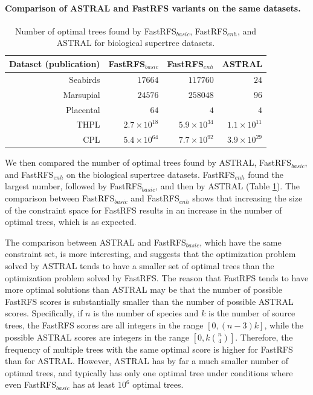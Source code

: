 \paragraph{Comparison of ASTRAL and FastRFS variants on the same datasets. }

\begin{table}
\begin{tabular}{|r|r|r|r|}
\hline
Dataset (publication) & FastRFS$_{basic}$ & FastRFS$_{enh}$ & ASTRAL \\
\hline
Seabirds \cite{kennedy2002seabird} & $17664$ & $117760$  & $24$  \\
Marsupial \cite{marsupial} & $24576$ & $258048$  &$96$ \\
Placental \cite{placental}& $64$ & $4$ & $4$\\
THPL \cite{THPL}& $2.7\times 10^{18}$ & $5.9 \times 10^{34}$ & $1.1 \times 10^{11}$ \\
CPL \cite{cpl}& $5.4\times 10^{64}$  & $7.7 \times 10^{92}$ &  $3.9 \times 10^{29}$\\
\hline
\end{tabular}

\caption{Number of optimal trees found by FastRFS$_{basic}$, FastRFS$_{enh}$, and ASTRAL  for biological supertree
  datasets. } \label{siesta::table:supertree_counts}
\end{table}


We then compared the number of optimal trees found by  ASTRAL, FastRFS$_{basic}$, and FastRFS$_{enh}$ on the biological supertree datasets.
FastRFS$_{enh}$ found the largest number,  followed by FastRFS$_{basic}$,
and then by ASTRAL (Table \ref{siesta::table:supertree_counts}). 
The comparison between FastRFS$_{basic}$ and FastRFS$_{enh}$ shows that increasing the size of the constraint space for FastRFS results in an increase in the number of optimal trees, which is as expected. 



The comparison between ASTRAL and FastRFS$_{basic}$, which have the same constraint set, is more interesting, and suggests that the optimization problem solved by ASTRAL tends to have a smaller set of optimal trees than the optimization problem solved by FastRFS.
The reason that FastRFS tends to have more optimal solutions than ASTRAL may be that the number of possible FastRFS scores is substantially smaller than the number of possible ASTRAL scores. 
Specifically, if $n$ is the number of species and $k$ is the number of source trees, the FastRFS scores are all integers in the range $[0,(n-3)k]$, while the possible ASTRAL scores are  integers in the range $[0,k{n \choose 4}]$.
Therefore, the frequency of  multiple trees with the same optimal score is higher for FastRFS than for ASTRAL.
However, ASTRAL has by far a much smaller number of optimal trees, and typically has only one optimal tree under conditions where even FastRFS$_{basic}$ has at least $10^6$ optimal trees.


